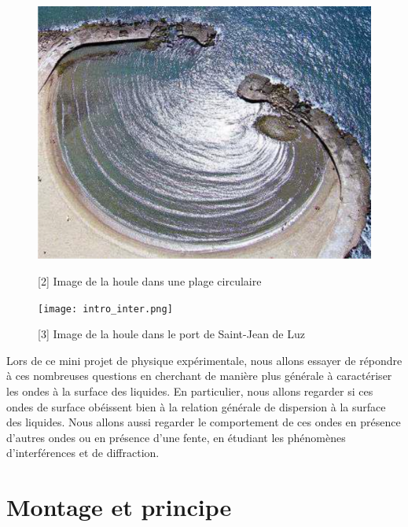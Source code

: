 \documentclass{report}
\begin{document}
\begin{figure}[H]
\centering
\begin{minipage}{0.45\textwidth}
  \centering
  \includegraphics[scale=0.2]{intro_diff.png}
  \caption{[2] Image de la houle dans une plage circulaire}
  \label{fig:s1}
\end{minipage}\hfill
\begin{minipage}{0.45\textwidth}
  \centering
  \texttt{[image: intro\_inter.png]}
  \caption{[3] Image de la houle dans le port de Saint-Jean de Luz}
  \label{fig:s2}
\end{minipage}
\end{figure}
Lors de ce mini projet de physique expérimentale, nous allons essayer de répondre à ces nombreuses questions en cherchant de manière plus générale à caractériser les ondes à la surface des liquides. En particulier, nous allons regarder si ces ondes de surface obéissent bien à la relation générale de dispersion à la surface des liquides. Nous allons aussi regarder le comportement de ces ondes en présence d'autres ondes ou en présence d'une fente, en étudiant les phénomènes  d'interférences et de diffraction.

\chapter{Montage et principe}
\end{document}
